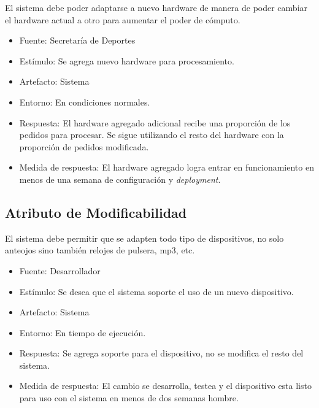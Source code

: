 El sistema debe poder adaptarse a nuevo hardware de manera de poder
cambiar el hardware actual a otro para aumentar el poder de cómputo.

\begin{itemize}
\itemsep1pt\parskip0pt
\item
  Fuente: Secretaría de Deportes
\item
  Estímulo: Se agrega nuevo hardware para procesamiento.
\item
  Artefacto: Sistema
\item
  Entorno: En condiciones normales.
\item
  Respuesta: El hardware agregado adicional recibe una proporción de los
  pedidos para procesar. Se sigue utilizando el resto del hardware con
  la proporción de pedidos modificada.
\item
  Medida de respuesta: El hardware agregado logra entrar en
  funcionamiento en menos de una semana de configuración y
  \emph{deployment}.
\end{itemize}

\subsection{Atributo de Modificabilidad}

El sistema debe permitir que se adapten todo tipo de dispositivos, no
solo anteojos sino también relojes de pulsera, mp3, etc.

\begin{itemize}
\itemsep1pt\parskip0pt
\item
  Fuente: Desarrollador
\item
  Estímulo: Se desea que el sistema soporte el uso de un nuevo
  dispositivo.
\item
  Artefacto: Sistema
\item
  Entorno: En tiempo de ejecución.
\item
  Respuesta: Se agrega soporte para el dispositivo, no se modifica el
  resto del sistema.
\item
  Medida de respuesta: El cambio se desarrolla, testea y el dispositivo
  esta listo para uso con el sistema en menos de dos semanas hombre.
\end{itemize}
